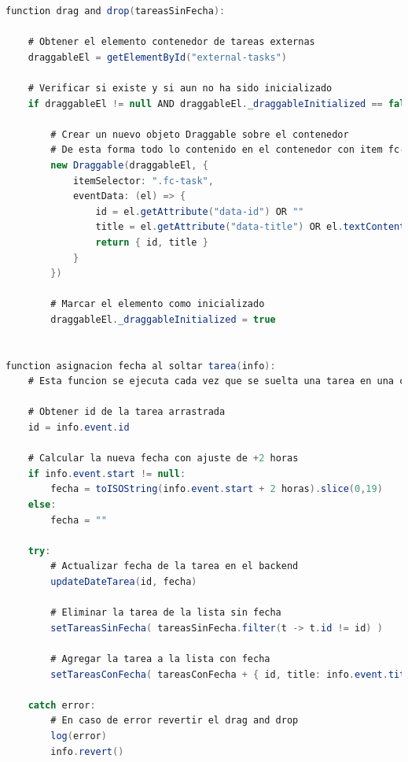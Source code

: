 \begin{lstlisting}[language=Java, caption={Pseudocódigo de tareas drag and drop y asignacion fecha al soltar tarea}]
function drag and drop(tareasSinFecha):

    # Obtener el elemento contenedor de tareas externas
    draggableEl = getElementById("external-tasks")

    # Verificar si existe y si aun no ha sido inicializado
    if draggableEl != null AND draggableEl._draggableInitialized == false:

        # Crear un nuevo objeto Draggable sobre el contenedor
        # De esta forma todo lo contenido en el contenedor con item fc-task es arrastrable
        new Draggable(draggableEl, {
            itemSelector: ".fc-task",
            eventData: (el) => {
                id = el.getAttribute("data-id") OR ""
                title = el.getAttribute("data-title") OR el.textContent OR ""
                return { id, title }
            }
        })

        # Marcar el elemento como inicializado
        draggableEl._draggableInitialized = true


function asignacion fecha al soltar tarea(info):
    # Esta funcion se ejecuta cada vez que se suelta una tarea en una celda del calendario 

    # Obtener id de la tarea arrastrada
    id = info.event.id

    # Calcular la nueva fecha con ajuste de +2 horas
    if info.event.start != null:
        fecha = toISOString(info.event.start + 2 horas).slice(0,19)
    else:
        fecha = ""

    try:
        # Actualizar fecha de la tarea en el backend
        updateDateTarea(id, fecha)

        # Eliminar la tarea de la lista sin fecha
        setTareasSinFecha( tareasSinFecha.filter(t -> t.id != id) )

        # Agregar la tarea a la lista con fecha
        setTareasConFecha( tareasConFecha + { id, title: info.event.title, start: fecha })

    catch error:
        # En caso de error revertir el drag and drop
        log(error)
        info.revert()
\end{lstlisting}

